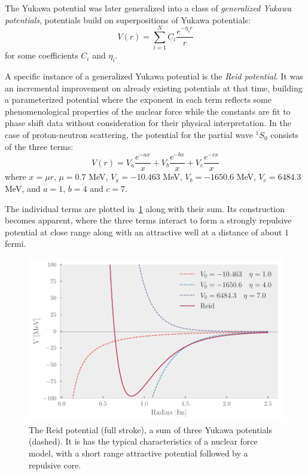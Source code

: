 The Yukawa potential was later generalized into a class of \textit{generalized
  Yukawa potentials}, potentials build on superpositions of Yukawa potentials:
\begin{equation*}
  V(r) = \sum_{i=1}^{N}C_{i}\frac{e^{-\eta_{i}r}}{r}
\end{equation*}
for some coefficients \(C_{i}\) and \(\eta_{i}\).

A specific instance of a generalized Yukawa potential is the \textit{Reid
  potential}\cite{reid}. It was an incremental improvement on already existing potentials
at that time, building a parameterized potential where the exponent in each term reflects some
phenomenological properties of the nuclear force while the constants are fit to
phase shift data without consideration for their physical interpretation.
In the case of proton-neutron scattering, the potential for the partial wave
\(^{1}S_{0}\) consists of the three terms:
\begin{equation*}
  V(r) = V_{a}\frac{e^{-ax}}{x} + V_{b}\frac{e^{-bx}}{x} + V_{c}\frac{e^{-cx}}{x}
\end{equation*}
where \(x=\mu r\), \(\mu=0.7\) MeV, \(V_{a}=-10.463\) MeV, \(V_{b}=-1650.6\)
MeV, \(V_{c}=6484.3\) MeV, and \(a=1\), \(b=4\) and \(c=7\).

The individual terms are plotted in~\cref{fig:reid} along with their sum. Its
construction becomes apparent, where the three terms interact to form a strongly
repulsive potential at close range along with an attractive well at a distance
of about \(1\) fermi.

\begin{figure}[ht]
  \centering
  \includegraphics[]{Figures/reid.pdf}
  \caption{\label{fig:reid} The Reid potential (full stroke), a sum of three Yukawa potentials
  (dashed). It is has the typical characteristics of a nuclear force model, with
  a short range attractive potential followed by a repulsive core.}
\end{figure}

